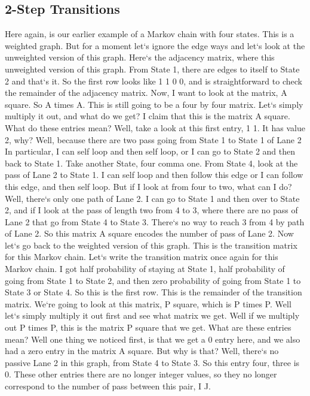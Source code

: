 \subsection{2-Step Transitions}
Here again, is our earlier example of a Markov chain with four states.
This is a weighted graph.
But for a moment let`s ignore the edge ways and let`s look at the unweighted version of this graph.
Here`s the adjacency matrix, where this unweighted version of this graph.
From State 1, there are edges to itself to State 2 and that`s it.
So the first row looks like 1 1 0 0, and is straightforward to check the remainder of the adjacency matrix.
Now, I want to look at the matrix, A square.
So A times A\@.
This is still going to be a four by four matrix.
Let`s simply multiply it out, and what do we get? I claim that this is the matrix A square.
What do these entries mean? Well, take a look at this first entry, 1 1.
It has value 2, why? Well, because there are two pass going from State 1 to State 1 of Lane 2 In particular, I can self loop and then self loop, or I can go to State 2 and then back to State 1.
Take another State, four comma one.
From State 4, look at the pass of Lane 2 to State 1.
I can self loop and then follow this edge or I can follow this edge, and then self loop.
But if I look at from four to two, what can I do? Well, there`s only one path of Lane 2.
I can go to State 1 and then over to State 2, and if I look at the pass of length two from 4 to 3, where there are no pass of Lane 2 that go from State 4 to State 3.
There`s no way to reach 3 from 4 by path of Lane 2.
So this matrix A square encodes the number of pass of Lane 2.
Now let`s go back to the weighted version of this graph.
This is the transition matrix for this Markov chain.
Let`s write the transition matrix once again for this Markov chain.
I got half probability of staying at State 1, half probability of going from State 1 to State 2, and then zero probability of going from State 1 to State 3 or State 4.
So this is the first row.
This is the remainder of the transition matrix.
We`re going to look at this matrix, P square, which is P times P\@.
Well let`s simply multiply it out first and see what matrix we get.
Well if we multiply out P times P, this is the matrix P square that we get.
What are these entries mean? Well one thing we noticed first, is that we get a 0 entry here, and we also had a zero entry in the matrix A square.
But why is that? Well, there`s no passive Lane 2 in this graph, from State 4 to State 3.
So this entry four, three is 0.
These other entries there are no longer integer values, so they no longer correspond to the number of pass between this pair, I J\@.

